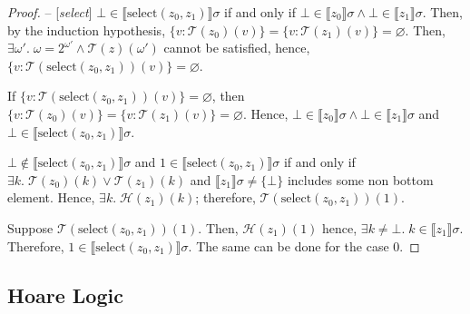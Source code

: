 \documentclass{article}
\newcommand{\select}{\text{select}}
\newcommand{\sem}[1]{\llbracket #1 \rrbracket }
\newcommand{\trans}[1]{\mathcal{T}( #1) }
\newcommand{\transh}[1]{\mathcal{H}( #1) }
\begin{document}
\begin{proof}
\vspace{0.5em}
\noindent
-- [\textit{select}]\quad
$\bot\in\sem{\select(z_0, z_1)}\sigma$ if and only if $\bot\in\sem{z_0}\sigma\land \bot\in\sem{z_1}\sigma$.
Then, by the induction hypothesis, $\{v : \trans{z_0}(v)\} = \{v : \trans{z_1}(v)\} = \varnothing$.
Then, $\exists \omega '.\; \omega  = 2^{\omega '}\land\trans{z}(\omega ')$ 
cannot be satisfied, hence, $\{v : \trans{\select(z_0, z_1)}(v)\} = \varnothing$.

If $\{v : \trans{\select(z_0, z_1)}(v)\} = \varnothing$, then 
$\{v : \trans{z_0}(v)\} = \{v : \trans{z_1}(v)\} = \varnothing$. Hence, $\bot\in\sem{z_0}\sigma\land \bot\in\sem{z_1}\sigma$
and $\bot\in\sem{\select(z_0, z_1)}\sigma$.

$\bot\not\in \sem{\select(z_0, z_1)}\sigma$ and $1\in\sem{\select(z_0, z_1)}\sigma$ 
if and only if $\exists k.\; \trans{z_0}(k) \lor \trans{z_1}(k)$ and $\sem{z_1}\sigma \neq \{\bot\}$ includes some 
non bottom element. 
Hence, $\exists k.\;\transh{z_1}(k)$; therefore, $\trans{\select(z_0, z_1)}(1)$. 

Suppose $\trans{\select(z_0, z_1)}(1)$. Then, $\transh{z_1}(1)$ hence, $\exists k\neq\bot.\; k\in\sem{z_1}\sigma$. 
Therefore, $1\in \sem{\select(z_0, z_1)}\sigma$.
The same can be done for the case $0$.



\quad

\end{proof}

\subsection{Hoare Logic}
\end{document}
